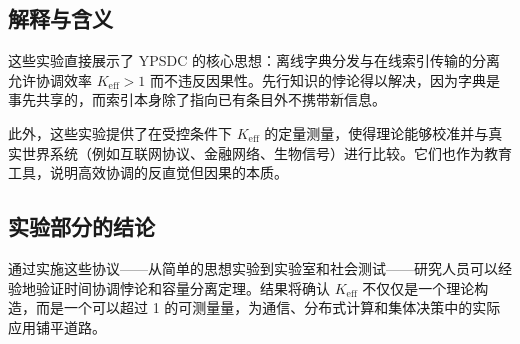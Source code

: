 \documentclass[12pt]{article}
\begin{document}
	\subsection{解释与含义}
	
	这些实验直接展示了 YPSDC 的核心思想：离线字典分发与在线索引传输的分离允许协调效率 \(K_{\mathrm{eff}} > 1\) 而不违反因果性。先行知识的悖论得以解决，因为字典是事先共享的，而索引本身除了指向已有条目外不携带新信息。
	
	此外，这些实验提供了在受控条件下 \(K_{\mathrm{eff}}\) 的定量测量，使得理论能够校准并与真实世界系统（例如互联网协议、金融网络、生物信号）进行比较。它们也作为教育工具，说明高效协调的反直觉但因果的本质。
	
	\subsection{实验部分的结论}
	
	通过实施这些协议——从简单的思想实验到实验室和社会测试——研究人员可以经验地验证时间协调悖论和容量分离定理。结果将确认 \(K_{\mathrm{eff}}\) 不仅仅是一个理论构造，而是一个可以超过 1 的可测量量，为通信、分布式计算和集体决策中的实际应用铺平道路。
	
\end{document}
